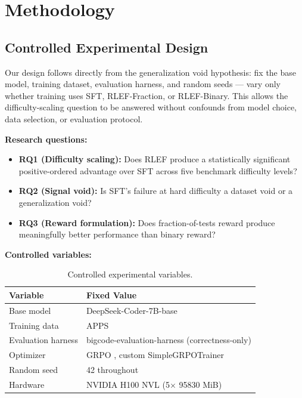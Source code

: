\section{Methodology}

\subsection{Controlled Experimental Design}

Our design follows directly from the generalization void hypothesis: fix the base model, training dataset, evaluation harness, and random seeds --- vary only whether training uses SFT, RLEF-Fraction, or RLEF-Binary. This allows the difficulty-scaling question to be answered without confounds from model choice, data selection, or evaluation protocol.

\textbf{Research questions:}
\begin{itemize}
  \item \textbf{RQ1 (Difficulty scaling):} Does RLEF produce a statistically significant positive-ordered advantage over SFT across five benchmark difficulty levels?
  \item \textbf{RQ2 (Signal void):} Is SFT's failure at hard difficulty a dataset void or a generalization void?
  \item \textbf{RQ3 (Reward formulation):} Does fraction-of-tests reward produce meaningfully better performance than binary reward?
\end{itemize}

\textbf{Controlled variables:}

\begin{table}[h]
\centering
\caption{Controlled experimental variables.}
\label{tab:controlled}
\begin{tabular}{ll}
\toprule
\textbf{Variable} & \textbf{Fixed Value} \\
\midrule
Base model & DeepSeek-Coder-7B-base \cite{Guo2024DeepSeekCoder} \\
Training data & APPS \cite{Hendrycks2021APPS} \\
Evaluation harness & bigcode-evaluation-harness (correctness-only) \\
Optimizer & GRPO \cite{Shao2024DeepSeekMath}, custom SimpleGRPOTrainer \\
Random seed & 42 throughout \\
Hardware & NVIDIA H100 NVL (5$\times$ 95830 MiB) \\
\bottomrule
\end{tabular}
\end{table}

